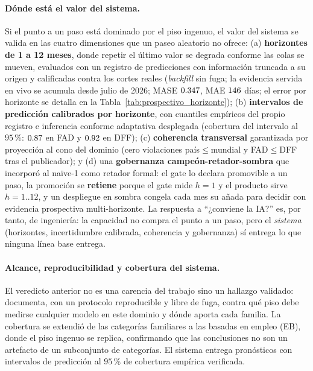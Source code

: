\documentclass[12pt,letterpaper]{report}
\begin{document}
\paragraph{Dónde está el valor del sistema.} Si el punto a un paso está dominado por el
piso ingenuo, el valor del sistema se valida en las cuatro dimensiones que un paseo
aleatorio no ofrece: (a) \textbf{horizontes de 1 a 12 meses}, donde repetir el último
valor se degrada conforme las colas se mueven, evaluados con un registro de
\factProspNScoredFmt{} predicciones con información truncada a su origen y calificadas
contra los cortes reales (\textit{backfill} sin fuga; la evidencia servida en vivo se
acumula desde julio de 2026; MASE $0.347$, MAE $146$ días; el error por horizonte se
detalla en la Tabla~\ref{tab:prospectivo_horizonte}); (b) \textbf{intervalos
de predicción calibrados por horizonte}, con cuantiles empíricos del propio registro e
inferencia conforme adaptativa desplegada (cobertura del intervalo al $95$\,\%: $0.87$ en
FAD y $0.92$ en DFF); (c) \textbf{coherencia transversal} garantizada por proyección al
cono del dominio (cero violaciones país$\leq$mundial y FAD$\leq$DFF tras el publicador); y
(d) una \textbf{gobernanza campeón-retador-sombra} que incorporó al naïve-1 como retador
formal: el gate lo declara promovible a un paso, la promoción se \textbf{retiene} porque
el gate mide $h=1$ y el producto sirve $h=1..12$, y un despliegue en sombra congela cada
mes su añada para decidir con evidencia prospectiva multi-horizonte. La respuesta a
``¿conviene la IA?'' es, por tanto, de ingeniería: la capacidad no compra el punto a un
paso, pero el \textit{sistema} (horizontes, incertidumbre calibrada, coherencia y
gobernanza) sí entrega lo que ninguna línea base entrega.

\paragraph{Alcance, reproducibilidad y cobertura del sistema.} El veredicto anterior no es
una carencia del trabajo sino un hallazgo validado: documenta, con un protocolo reproducible
y libre de fuga, contra qué piso debe medirse cualquier modelo en este dominio y dónde
aporta cada familia. La cobertura se extendió de las categorías familiares a las basadas
en empleo (EB), donde el piso ingenuo se replica, confirmando que las conclusiones no son
un artefacto de un subconjunto de categorías. El sistema entrega pronósticos con
intervalos de predicción al $95$\,\% de cobertura empírica verificada.
\end{document}
